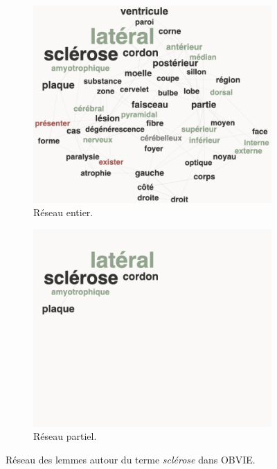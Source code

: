\begin{figure}[h]
	\centering
	\begin{subfigure}{.5\textwidth}
		\centering
		\includegraphics[width=.9\linewidth]{img/reseau_SLA.png}
		\caption{Réseau entier.}
		\label{fig:reseau_SLA}
	\end{subfigure}%
	\begin{subfigure}{.5\textwidth}
		\centering
		\includegraphics[width=.9\linewidth]{img/reseau_SLA_mini.png}
		\caption{Réseau partiel.}
		\label{fig:reseau_SLA_mini}
	\end{subfigure}
	\caption{Réseau des lemmes autour du terme \textit{sclérose} dans \textsc{OBVIE}.}
	\label{fig:reseaux_SLA}
\end{figure}

